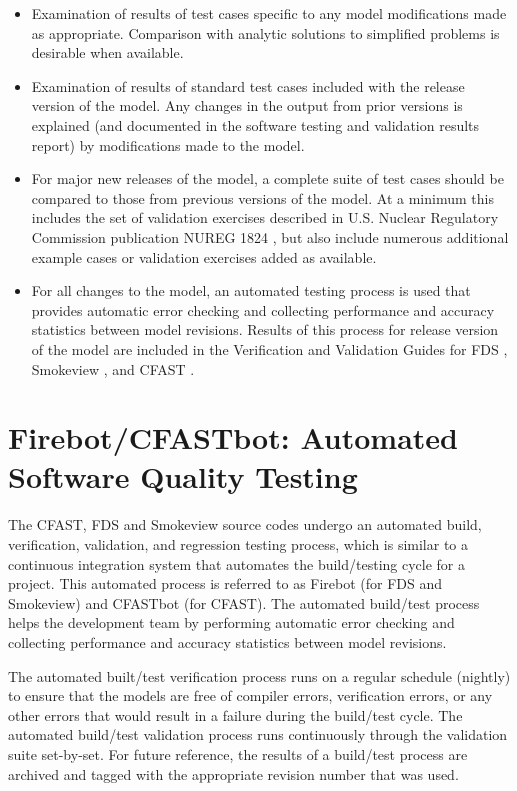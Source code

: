 \documentclass[11pt]{book}
\begin{document}
\begin{itemize}
\item Examination of results of test cases specific to any model modifications made as appropriate.  Comparison with analytic solutions to simplified problems is desirable when available.

\item Examination of results of standard test cases included with the release version of the model. Any changes in the output from prior versions is explained (and documented in the software testing and validation results report) by modifications made to the model.

\item For major new releases of the model, a complete suite of test cases should be compared to those from previous versions of the model.  At a minimum this includes the set of validation exercises described in U.S. Nuclear Regulatory Commission publication NUREG 1824 \cite{NUREG_1824, NUREG_1824_Sup_1}, but also include numerous additional example cases or validation exercises added as available.

\item For all changes to the model, an automated testing process is used that provides automatic error checking and collecting performance and accuracy statistics between model revisions. Results of this process for release version of the model are included in the Verification and Validation Guides for FDS \cite{FDS_Validation_Guide, FDS_Verification_Guide}, Smokeview \cite{Smokeview_Verification_Guide}, and CFAST \cite{CFAST_Valid_Guide_7}.
\end{itemize}


\section{Firebot/CFASTbot: Automated Software Quality Testing}

The CFAST, FDS and Smokeview source codes undergo an automated build, verification, validation, and regression testing process, which is similar to a continuous integration system that automates the build/testing cycle for a project. This automated process is referred to as Firebot (for FDS and Smokeview) and CFASTbot (for CFAST). The automated build/test process helps the development team by performing automatic error checking and collecting performance and accuracy statistics between model revisions.

The automated built/test verification process runs on a regular schedule (nightly) to ensure that the models are free of compiler errors, verification errors, or any other errors that would result in a failure during the build/test cycle. The automated build/test validation process runs continuously through the validation suite set-by-set. For future reference, the results of a build/test process are archived and tagged with the appropriate revision number that was used.
\end{document}
